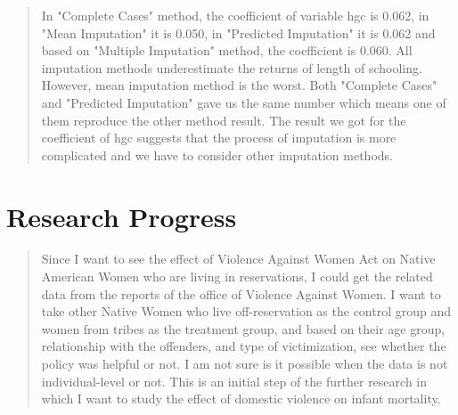 \documentclass{article}
\begin{document}
\begin{quote}
\selectfont %
In "Complete Cases" method, the coefficient of variable hgc is 0.062, in "Mean Imputation" it is 0.050, in "Predicted Imputation" it is 0.062 and based on "Multiple Imputation" method, the coefficient is 0.060. All imputation methods underestimate the returns of length of schooling. However, mean imputation method is the worst. Both "Complete Cases" and "Predicted Imputation" gave us the same number which means one of them reproduce the other method result.
The result we got for the coefficient of hgc suggests that the process of imputation is more complicated and we have to consider other imputation methods. 
\end{quote}
\clearpage  

\section{Research Progress}
\begin{quote}
\selectfont %
Since I want to see the effect of Violence Against Women Act on Native American Women who are living in reservations, I could get the related data from the reports of the office of Violence Against Women. I want to take other Native Women who live off-reservation as the control group and women from tribes as the treatment group, and based on their age group, relationship with the offenders, and type of victimization, see whether the policy was helpful or not. I am not sure is it possible when the data is not individual-level or not. This is an initial step of the further research in which I want to study the effect of domestic violence on infant mortality. 
\end{quote}
\end{document}
